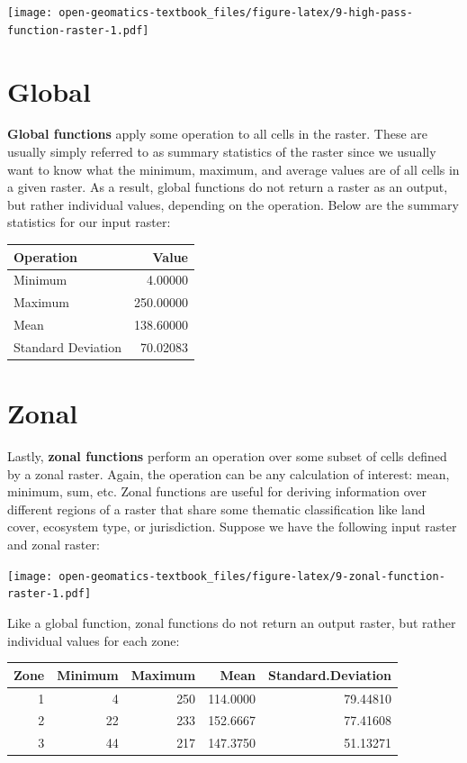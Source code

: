 \documentclass[
]{book}
\begin{document}
\texttt{[image: open-geomatics-textbook\_files/figure-latex/9-high-pass-function-raster-1.pdf]}

\hypertarget{global}{%
\section{Global}\label{global}}

\textbf{Global functions} apply some operation to all cells in the raster. These are usually simply referred to as summary statistics of the raster since we usually want to know what the minimum, maximum, and average values are of all cells in a given raster. As a result, global functions do not return a raster as an output, but rather individual values, depending on the operation. Below are the summary statistics for our input raster:

\begin{tabular}{lr}
\toprule
Operation & Value\\
\midrule
Minimum & 4.00000\\
Maximum & 250.00000\\
Mean & 138.60000\\
Standard Deviation & 70.02083\\
\bottomrule
\end{tabular}

\hypertarget{zonal}{%
\section{Zonal}\label{zonal}}

Lastly, \textbf{zonal functions} perform an operation over some subset of cells defined by a zonal raster. Again, the operation can be any calculation of interest: mean, minimum, sum, etc. Zonal functions are useful for deriving information over different regions of a raster that share some thematic classification like land cover, ecosystem type, or jurisdiction. Suppose we have the following input raster and zonal raster:

\texttt{[image: open-geomatics-textbook\_files/figure-latex/9-zonal-function-raster-1.pdf]}

Like a global function, zonal functions do not return an output raster, but rather individual values for each zone:

\begin{tabular}{rrrrr}
\toprule
Zone & Minimum & Maximum & Mean & Standard.Deviation\\
\midrule
1 & 4 & 250 & 114.0000 & 79.44810\\
2 & 22 & 233 & 152.6667 & 77.41608\\
3 & 44 & 217 & 147.3750 & 51.13271\\
\bottomrule
\end{tabular}
\end{document}
